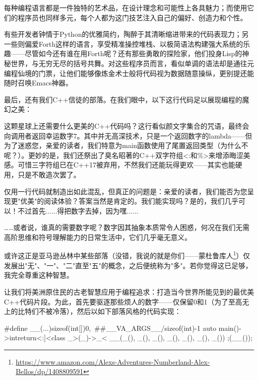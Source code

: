 
每种编程语言都是一件独特的艺术品，在设计理念和可能性上各具魅力；而使用它们的程序员也同样多元，每个人都为这门技艺注入自己的偏好、创造力和个性。

有些开发者钟情于Python的优雅简约，陶醉于其清晰缩进带来的代码表现力；另一些则偏爱Forth这样的语言，享受精准操控堆栈、以极简语法构建强大系统的乐趣——尽管如今还有谁在用Forth呢？还有那些勇敢的探险家，他们投身Lisp的神秘世界，与无穷无尽的括号共舞。对这些程序员而言，看似单调的语法却是通往元编程仙境的门票，让他们能够像炼金术士般将代码视为数据随意操纵，更别提还能随时召唤Emacs神器。

最后，还有我们C++信徒的部落。在我们眼中，以下这行代码足以展现编程的魔幻之美：

\begin{cpp}
auto main()->int{return<:]<class _>(_)->_<%
\end{cpp}

这颗星球上还需要什么更美的C++代码吗？这行看似颜文字集合的咒语，最终会向调用者返回幸运数字7。其中并无高深技术，只是一个返回数字的lambda——但为了迷惑您，亲爱的读者，我们特意为main函数使用了尾置返回类型（为什么不呢？）。更妙的是，我们还祭出了臭名昭著的C++双字符组<:和\%>来增添晦涩美感。可惜三字符组已在C++17被弃用，不然我们还能玩得更欢——其实也能硬用，只是不敢造次罢了。

仅用一行代码就制造出如此混乱，但真正的问题是：亲爱的读者，我们能否为您呈现更"优美"的阅读体验？答案当然是肯定的。我们能实现吗？是的，我们几乎可以！不过首先......得把数字去掉，因为嘿......


……或者说，谁真的需要数字呢？数字因其抽象本质常令人困惑，何况在我们无需高阶思维和符号理解能力的日常生活中，它们几乎毫无意义。

或许这正是亚马逊丛林中某些部落（没错，我说的就是你们——蒙杜鲁库人\footnote{\url{https://www.amazon.com/Alexs-Adventures-Numberland-Alex-Bellos/dp/1408809591}}）仅发展出"无"、"一"、"二"直至"五"的概念，之后便统称为"多"。若你觉得这已足够，我完全尊重这种智慧。

让我们将美洲原住民的古老智慧应用于编程追求：打造当今世界所能见到的最优美C++代码片段。为此，首先要驱逐那些烦人的数字——仅保留0和1（为了至高无上的比特们不被冷落），然后以如下部落风格的代码实现：

\begin{cpp}
#define __(...)sizeof(int[]){0,\
                            ##__VA_ARGS__}/sizeof(int)-1
  auto main()->int{return<:]<class _>(_)->_<%
  __(_(), _(), _(), _(), _(), _(), _()) ;}(__());%
\end{cpp}

